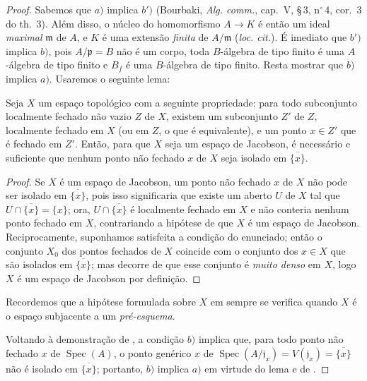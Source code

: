 \begin{proof}
Sabemos que $a)$ implica $b')$ (Bourbaki, \emph{Alg. comm.}, cap.~V, \S\,3, n$^\circ$\,4, cor.~3 do th.~3).
Além disso, o núcleo do homomorfismo $A\to K$ é então um ideal \emph{maximal} $\mathfrak{m}$ de $A$, e $K$ é uma extensão \emph{finita} de $A/\mathfrak{m}$ (\emph{loc. cit.}).
É imediato que $b')$ implica $b)$, pois $A/\mathfrak{p}=B$ não é um corpo, toda $B$-álgebra de tipo finito é uma $A$-álgebra de tipo finito e $B_f$ é uma $B$-álgebra de tipo finito.
Resta mostrar que $b)$ implica $a)$.
Usaremos o seguinte lema:

\begin{lemma}[10.4.5.1]
\label{IV.10.4.5.1}
Seja $X$ um espaço topológico com a seguinte propriedade: para todo subconjunto localmente fechado não vazio $Z$ de $X$, existem um subconjunto $Z'$ de $Z$, localmente fechado em $X$ (ou em $Z$, o que é equivalente), e um ponto $x\in Z'$ que é fechado em $Z'$.
Então, para que $X$ seja um espaço de Jacobson, é necessário e suficiente que nenhum ponto não fechado $x$ de $X$ seja isolado em $\overline{\{x\}}$.
\end{lemma}

\begin{proof}
Se $X$ é um espaço de Jacobson, um ponto não fechado $x$ de $X$ não pode ser isolado em $\overline{\{x\}}$, pois isso significaria que existe um aberto $U$ de $X$ tal que $U\cap\overline{\{x\}}=\{x\}$; ora, $U\cap\overline{\{x\}}$ é localmente fechado em $X$ e não conteria nenhum ponto fechado em $X$, contrariando a hipótese de que $X$ é um espaço de Jacobson.
Reciprocamente, suponhamos satisfeita a condição do enunciado; então o conjunto $X_0$ dos pontos fechados de $X$ coincide com o conjunto dos $x\in X$ que são isolados em $\overline{\{x\}}$; mas decorre de  que
esse conjunto é \emph{muito denso} em $X$, logo $X$ é um espaço de Jacobson por definição.
\end{proof}

Recordemos  que a hipótese formulada sobre $X$ em  sempre se verifica quando $X$ é o espaço subjacente a um \emph{pré-esquema}.

Voltando à demonstração de , a condição $b)$ implica que, para todo ponto não fechado $x$ de $\operatorname{Spec}(A)$, o ponto genérico $x$ de $\operatorname{Spec}(A/\mathfrak{j}_x)=V(\mathfrak{j}_x)=\overline{\{x\}}$ não é isolado em $\overline{\{x\}}$; portanto, $b)$ implica $a)$ em virtude do lema  e de .
\end{proof}

